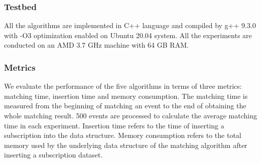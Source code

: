 \documentclass[runningheads]{llncs}
\begin{document}
\subsubsection{Testbed}
All the algorithms are implemented in C++ language and compiled by g++ 9.3.0 with -O3 optimization enabled on Ubuntu 20.04 system. All the experiments are conducted on an AMD 3.7 GHz machine with 64 GB RAM.


\subsubsection{Metrics}
We evaluate the performance of the five algorithms in terms of three metrics: matching time, insertion time and memory consumption. The matching time is measured from the beginning of matching an event to the end of obtaining the whole matching result. 500 events are processed to calculate the average matching time in each experiment. 
Insertion time refers to the time of inserting a subscription into the data structure. 
Memory consumption refers to the total memory used by the underlying data structure of the matching algorithm after inserting a subscription dataset.
\end{document}
